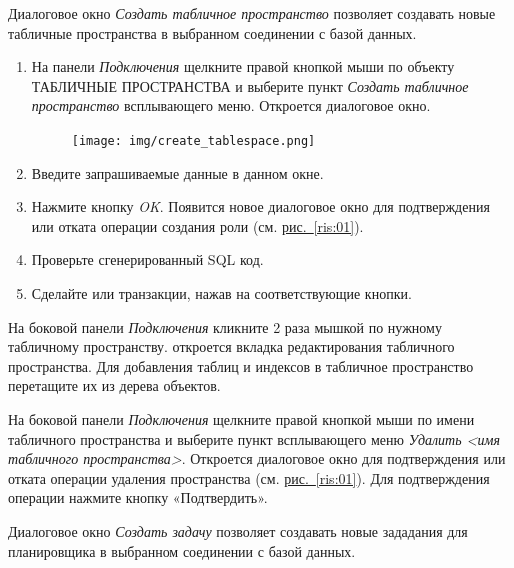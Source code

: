 

Диалоговое окно \textit{Создать табличное пространство} позволяет создавать новые табличные пространства в выбранном соединении с базой данных.

\begin{enumerate}[leftmargin=26pt]
	\item На панели \textit{Подключения} щелкните правой кнопкой мыши по объекту ТАБЛИЧНЫЕ ПРОСТРАНСТВА и выберите пункт \textit{Создать табличное пространство} всплывающего меню. Откроется диалоговое окно.
	\begin{figure}[H]
		\centering
		\texttt{[image: img/create\_tablespace.png]}
	\end{figure}
	\item Введите запрашиваемые данные в данном окне.
	\item Нажмите кнопку \textit{OK}. Появится новое диалоговое окно для подтверждения или отката операции создания роли (см. \hyperref[ris:01]{рис.~\ref{ris:01}}).
	\item Проверьте сгенерированный SQL код.
	\item Сделайте  или  транзакции, нажав на соответствующие кнопки.
\end{enumerate}

На боковой панели \textit{Подключения} кликните 2 раза мышкой по нужному табличному пространству. откроется вкладка редактирования табличного пространства. Для добавления таблиц и индексов в табличное пространство перетащите их из дерева объектов. 

На боковой панели \textit{Подключения} щелкните правой кнопкой мыши по имени табличного пространства и выберите пункт всплывающего меню \textit{Удалить <имя табличного пространства>}. Откроется  диалоговое окно для подтверждения или отката операции удаления пространства (см. \hyperref[ris:01]{рис.~\ref{ris:01}}). Для подтверждения операции нажмите кнопку «Подтвердить».



Диалоговое окно \textit{Создать задачу} позволяет создавать новые зададания для планировщика в выбранном соединении с базой данных.

